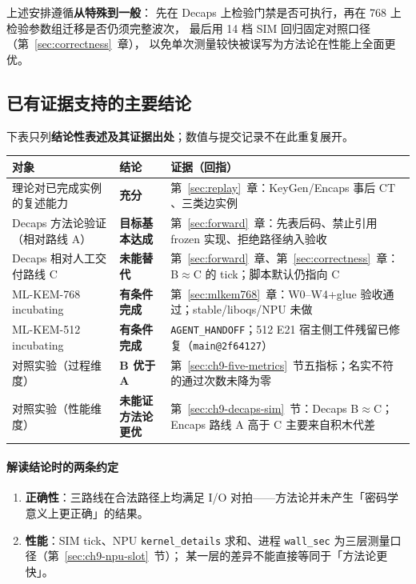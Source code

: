 \documentclass[UTF8,a4paper,11pt]{ctexart}
\theoremstyle{definition}
\theoremstyle{plain}
\theoremstyle{remark}
\numberwithin{figure}{section}
\numberwithin{table}{section}
\begin{document}
\noindent 上述安排遵循\textbf{从特殊到一般}：
先在 Decaps 上检验门禁是否可执行，再在 768 上检验参数组迁移是否仍须完整波次，
最后用 14 档 SIM 回归固定对照口径（第~\ref{sec:correctness}~章），
以免单次测量较快被误写为方法论在性能上全面更优。

\subsection{已有证据支持的主要结论}

下表只列\textbf{结论性表述及其证据出处}；数值与提交记录不在此重复展开。

\begin{center}
\small
\begin{tabular}{@{}L{3.4cm}L{2.6cm}L{7.4cm}@{}}
  \toprule
  对象 & 结论 & 证据（回指） \\
  \midrule
  理论对已完成实例的复述能力 &
  \textbf{充分} &
  第~\ref{sec:replay}~章：KeyGen/Encaps 事后 $\mathrm{CT}$、三类边实例 \\
  Decaps 方法论验证（相对路线 A） &
  \textbf{目标基本达成} &
  第~\ref{sec:forward}~章：先表后码、禁止引用 frozen 实现、拒绝路径纳入验收 \\
  Decaps 相对人工交付路线 C &
  \textbf{未能替代} &
  第~\ref{sec:forward}~章、第~\ref{sec:correctness}~章：B$\approx$C 的 tick；脚本默认仍指向 C \\
  ML-KEM-768 incubating &
  \textbf{有条件完成} &
  第~\ref{sec:mlkem768}~章：W0--W4+glue 验收通过；stable/liboqs/NPU 未做 \\
  ML-KEM-512 incubating &
  \textbf{有条件完成} &
  \texttt{AGENT\_HANDOFF}；512 E21 宿主侧工件残留已修复（\texttt{main@2f64127}） \\
  对照实验（过程维度） &
  \textbf{B 优于 A} &
  第~\ref{sec:ch9-five-metrics}~节五指标；名实不符的通过次数未降为零 \\
  对照实验（性能维度） &
  \textbf{未能证方法论更优} &
  第~\ref{sec:ch9-decaps-sim}~节：Decaps B$\approx$C；Encaps 路线 A 高于 C 主要来自积木代差 \\
  \bottomrule
\end{tabular}
\end{center}

\paragraph{解读结论时的两条约定}
\begin{enumerate}
  \item \textbf{正确性}：三路线在合法路径上均满足 I/O 对拍——方法论并未产生「密码学意义上更正确」的结果。
  \item \textbf{性能}：SIM tick、NPU \texttt{kernel\_details} 求和、进程 \texttt{wall\_sec} 为三层测量口径（第~\ref{sec:ch9-npu-slot}~节）；
        某一层的差异不能直接等同于「方法论更快」。
\end{enumerate}
\end{document}
